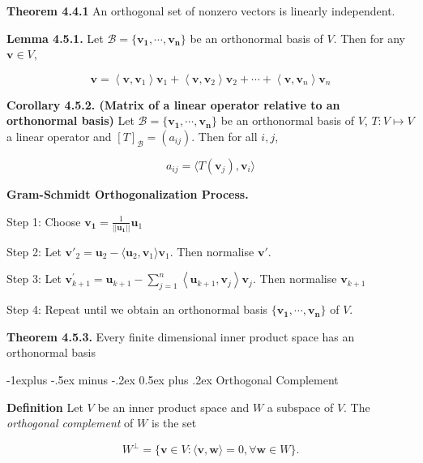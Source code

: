 \documentclass[10pt,landscape]{article}
\makeatletter
\renewcommand{\subsection}{\@startsection{subsection}{2}{0mm}%
                                {-1explus -.5ex minus -.2ex}%
                                {0.5ex plus .2ex}%
                                {\normalfont\normalsize\bfseries}}
\makeatother
\begin{document}
\begin{multicols}{4}
\textbf{Theorem 4.4.1} An orthogonal set of nonzero vectors is linearly independent.


\textbf{Lemma 4.5.1.} Let $\mathcal{B} = \{ \mathbf{v_1, \cdots, v_n} \}$ be an orthonormal basis of $V$. Then for any $\mathbf{v} \in V,$

$$
\mathbf{v}=\left\langle\mathbf{v}, \mathbf{v}_{1}\right\rangle \mathbf{v}_{1}+\left\langle\mathbf{v}, \mathbf{v}_{2}\right\rangle \mathbf{v}_{2}+\cdots+\left\langle\mathbf{v}, \mathbf{v}_{n}\right\rangle \mathbf{v}_{n}
$$

\textbf{Corollary 4.5.2. (Matrix of a linear operator relative to an orthonormal basis)} Let $\mathcal{B} = \{ \mathbf{v_1, \cdots, v_n} \}$ be an orthonormal basis of $V$, $T: V \mapsto V$ a linear operator and $[T]_{\mathcal{B}} = (a_{ij})$. Then for all $i, j$,

$$
a_{ij} = \langle T(\mathbf{v}_j), \mathbf{v}_i \rangle
$$

\textbf{Gram-Schmidt Orthogonalization Process.}

Step 1: Choose $\mathbf{v_1} = \frac{1}{|| \mathbf{u_1} ||} \mathbf{u}_1$

Step 2: Let $\mathbf{v}'_2 = \mathbf{u}_2 - \langle \mathbf{u}_2, \mathbf{v}_1 \rangle \mathbf{v}_1$. Then normalise $\mathbf{v}'$.

Step 3:  Let $
\mathbf{v}_{k+1}^{\prime}=\mathbf{u}_{k+1}-\sum_{j=1}^{n}\left\langle\mathbf{u}_{k+1}, \mathbf{v}_{j}\right\rangle \mathbf{v}_{j}
$. Then normalise $\mathbf{v}_{k+1}$

Step 4: Repeat until we obtain an orthonormal basis $\{ \mathbf{v_1}, \cdots, \mathbf{v_n} \}$ of $V$.

\textbf{Theorem 4.5.3.} Every finite dimensional inner product space has an orthonormal basis

\subsection{Orthogonal Complement}

\textbf{Definition} Let $V$ be an inner product space and $W$ a subspace of $V$. The \textit{orthogonal complement} of $W$ is the set

$$
W^{\perp} = \{ \mathbf{v} \in V: \langle \mathbf{v, w} \rangle = 0, \forall \mathbf{w} \in W \}.
$$


\end{multicols}
\end{document}
